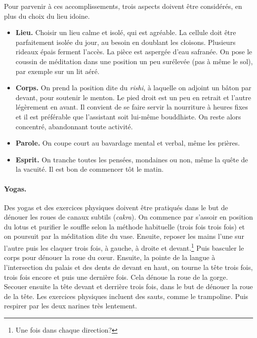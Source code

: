 \documentclass[11pt,a4paper]{article}
\begin{document}
Pour parvenir à ces accomplissements, trois aspects doivent être
considérés, en plus du choix du lieu idoine.
\begin{itemize}

  \item \textbf{Lieu.} Choisir un lieu calme et isolé, qui est
    agréable. La cellule doit être parfaitement isolée du jour, au
    besoin en doublant les cloisons. Plusieurs rideaux épais ferment
    l'accès. La pièce est aspergée d'eau safranée. On pose le coussin
    de méditation dans une position un peu surélevée (pas à même le
    sol), par exemple sur un lit aéré.

  \item \textbf{Corps.} On prend la position dite du \emph{rishi}, à
    laquelle on adjoint un bâton par devant, pour soutenir le
    menton. Le pied droit est un peu en retrait et l'autre légèrement
    en avant. Il convient de se faire servir la nourriture à heures
    fixes et il est préférable que l'assistant soit lui\hyp{}même
    bouddhiste. On reste alors concentré, abandonnant toute activité.

  \item \textbf{Parole.} On coupe court au bavardage mental et verbal,
    même les prières.

  \item \textbf{Esprit.} On tranche toutes les pensées, mondaines ou
    non, même la quête de la vacuité. Il est bon de commencer tôt le
    matin.

\end{itemize}

\paragraph{Yogas.}

Des yogas et des exercices physiques doivent être pratiqués dans le
but de dénouer les roues de canaux subtils (\emph{cakra}). On commence
par s'assoir en position du lotus et purifier le souffle selon la
méthode habituelle (trois fois trois fois) et on poursuit par la
méditation dite du vase. Ensuite, reposer les mains l'une sur l'autre
puis les claquer trois fois, à gauche, à droite et
devant.\footnote{Une fois dans chaque direction?} Puis basculer le
corps pour dénouer la roue du c{\oe}ur. Ensuite, la pointe de la
langue à l'intersection du palais et des dents de devant en haut, on
tourne la tête trois fois, trois fois encore et puis une dernière
fois. Cela dénoue la roue de la gorge. Secouer ensuite la tête devant
et derrière trois fois, dans le but de dénouer la roue de la tête. Les
exercices physiques incluent des sauts, comme le trampoline. Puis
respirer par les deux narines très lentement.
\end{document}
